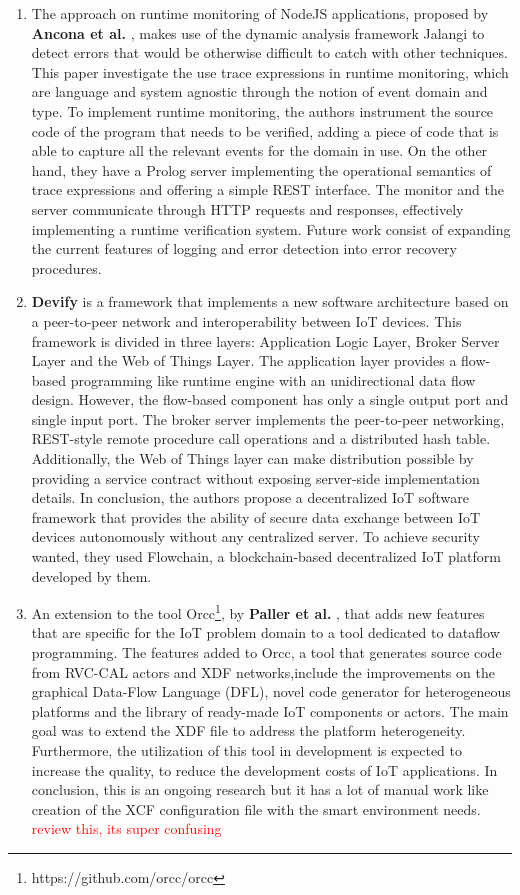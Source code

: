 \begin{enumerate}
    \item The approach on runtime monitoring of NodeJS applications, proposed by \textbf{Ancona et al.} \cite{runtime_monitoring}, makes use of the dynamic analysis framework Jalangi to detect errors that would be otherwise difficult to catch with other techniques. This paper investigate the use trace expressions in runtime monitoring, which are language and system agnostic through the notion of event domain and type. To implement runtime monitoring, the authors instrument the source code of the program that needs to be verified, adding a piece of code that is able to capture all the relevant events for the domain in use. On the other hand, they have a Prolog server implementing the operational semantics of trace expressions and offering a simple REST interface. The monitor and the server communicate through HTTP requests and responses, effectively implementing a runtime verification system. Future work consist of expanding the current features of logging and error detection into error recovery procedures.
    \item \textbf{Devify} \cite{devify} is a framework that implements a new software architecture based on a peer-to-peer network and interoperability between IoT devices. This framework is divided in three layers: Application Logic Layer, Broker Server Layer and the Web of Things Layer. The application layer provides a flow-based programming like runtime engine with an unidirectional data flow design. However, the flow-based component has only a single output port and single input port. The broker server implements the peer-to-peer networking, REST-style remote procedure call operations and a distributed hash table. Additionally, the Web of Things layer can make distribution possible by providing a service contract without exposing server-side implementation details. In conclusion, the authors propose a decentralized IoT software framework that provides the ability of secure data exchange between IoT devices autonomously without any centralized server. To achieve security wanted, they used Flowchain, a blockchain-based decentralized IoT platform developed by them.
    \item An extension to the tool Orcc\footnote{https://github.com/orcc/orcc}, by \textbf{Paller et al.} \cite{orcc_extension}, that adds new features that are specific for the IoT problem domain to a tool dedicated to dataflow programming. The features added to Orcc, a tool that generates source code from RVC-CAL actors and XDF networks,include the improvements on the graphical Data-Flow Language (DFL), novel code generator for heterogeneous platforms and the library of ready-made IoT components or actors. The main goal was to extend the XDF file to address the platform heterogeneity. Furthermore, the utilization of this tool in development is expected to increase the quality, to reduce the development costs of IoT applications. In conclusion, this is an ongoing research but it has a lot of manual work like creation of the XCF configuration file with the smart environment needs. \textcolor{red}{review this, its super confusing}

\end{enumerate}
